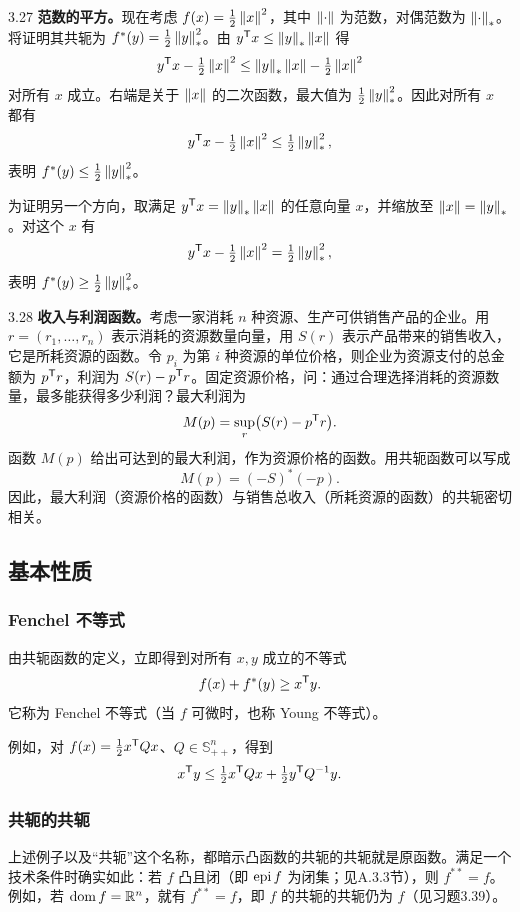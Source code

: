 \begin{origexample}{3.27}
\textbf{范数的平方。}现在考虑 $f(x)=\tfrac12\left\lVert x\right\rVert^2$，其中 $\left\lVert \cdot\right\rVert$ 为范数，对偶范数为 $\left\lVert \cdot\right\rVert_*$。将证明其共轭为 $f^*(y)=\tfrac12\left\lVert y\right\rVert_*^2$。由 $y^\mathsf T x\leq\left\lVert y\right\rVert_*\left\lVert x\right\rVert$ 得
\[y^\mathsf T x-\tfrac12\left\lVert x\right\rVert^2\leq\left\lVert y\right\rVert_*\left\lVert x\right\rVert-\tfrac12\left\lVert x\right\rVert^2\]
对所有 $x$ 成立。右端是关于 $\left\lVert x\right\rVert$ 的二次函数，最大值为 $\tfrac12\left\lVert y\right\rVert_*^2$。因此对所有 $x$ 都有
\[y^\mathsf T x-\tfrac12\left\lVert x\right\rVert^2\leq\tfrac12\left\lVert y\right\rVert_*^2,\]
表明 $f^*(y)\leq\tfrac12\left\lVert y\right\rVert_*^2$。

为证明另一个方向，取满足 $y^\mathsf T x=\left\lVert y\right\rVert_*\left\lVert x\right\rVert$ 的任意向量 $x$，并缩放至 $\left\lVert x\right\rVert=\left\lVert y\right\rVert_*$。对这个 $x$ 有
\[y^\mathsf T x-\tfrac12\left\lVert x\right\rVert^2=\tfrac12\left\lVert y\right\rVert_*^2,\]
表明 $f^*(y)\geq\tfrac12\left\lVert y\right\rVert_*^2$。
\end{origexample}
\begin{origexample}{3.28}
\textbf{收入与利润函数。}考虑一家消耗 $n$ 种资源、生产可供销售产品的企业。用 $r=(r_1,\ldots,r_n)$ 表示消耗的资源数量向量，用 $S(r)$ 表示产品带来的销售收入，它是所耗资源的函数。令 $p_i$ 为第 $i$ 种资源的单位价格，则企业为资源支付的总金额为 $p^\mathsf T r$，利润为 $S(r)-p^\mathsf T r$。固定资源价格，问：通过合理选择消耗的资源数量，最多能获得多少利润？最大利润为
\[M(p)=\sup_r\bigl(S(r)-p^\mathsf T r\bigr).\]
函数 $M(p)$ 给出可达到的最大利润，作为资源价格的函数。用共轭函数可以写成
\[M(p)=(-S)^*(-p).\]
因此，最大利润（资源价格的函数）与销售总收入（所耗资源的函数）的共轭密切相关。
\end{origexample}
\subsection{基本性质}
\subsubsection*{Fenchel 不等式}
由共轭函数的定义，立即得到对所有 $x,y$ 成立的不等式
\[f(x)+f^*(y)\geq x^\mathsf T y.\]
它称为 Fenchel 不等式（当 $f$ 可微时，也称 Young 不等式）。

例如，对 $f(x)=\tfrac12x^\mathsf T Qx$、$Q\in\mathbb S_{++}^n$，得到
\[x^\mathsf T y\leq\tfrac12x^\mathsf T Qx+\tfrac12y^\mathsf T Q^{-1}y.\]
\subsubsection*{共轭的共轭}
上述例子以及“共轭”这个名称，都暗示凸函数的共轭的共轭就是原函数。满足一个技术条件时确实如此：若 $f$ 凸且闭（即 $\operatorname{epi} f$ 为闭集；见A.3.3节），则 $f^{**}=f$。例如，若 $\operatorname{dom} f=\mathbb R^n$，就有 $f^{**}=f$，即 $f$ 的共轭的共轭仍为 $f$（见习题3.39）。
